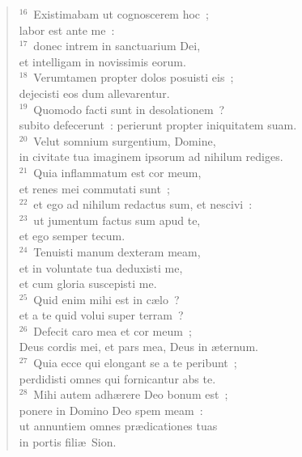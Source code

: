 \begin{flushleft}
\begin{verse}
${}^{16}$~Existimabam ut cognoscerem hoc~;\\ labor est ante me~:\\
${}^{17}$~donec intrem in sanctuarium Dei,\\ et intelligam in novissimis eorum.\\
${}^{18}$~Verumtamen propter dolos posuisti eis~;\\ dejecisti eos dum allevarentur.\\
${}^{19}$~Quomodo facti sunt in desolationem~?\\ subito defecerunt~: perierunt propter iniquitatem suam.\\
${}^{20}$~Velut somnium surgentium, Domine,\\ in civitate tua imaginem ipsorum ad nihilum rediges.\\
${}^{21}$~Quia inflammatum est cor meum,\\ et renes mei commutati sunt~;\\
${}^{22}$~et ego ad nihilum redactus sum, et nescivi~:\\
${}^{23}$~ut jumentum factus sum apud te,\\ et ego semper tecum.\\
${}^{24}$~Tenuisti manum dexteram meam,\\ et in voluntate tua deduxisti me,\\ et cum gloria suscepisti me.\\
${}^{25}$~Quid enim mihi est in c\ae lo~?\\ et a te quid volui super terram~?\\
${}^{26}$~Defecit caro mea et cor meum~;\\ Deus cordis mei, et pars mea, Deus in \ae ternum.\\
${}^{27}$~Quia ecce qui elongant se a te peribunt~;\\ perdidisti omnes qui fornicantur abs te.\\
${}^{28}$~Mihi autem adh\ae rere Deo bonum est~;\\ ponere in Domino Deo spem meam~:\\ ut annuntiem omnes pr\ae dicationes tuas\\ in portis fili\ae\ Sion.\end{verse}\end{flushleft}



